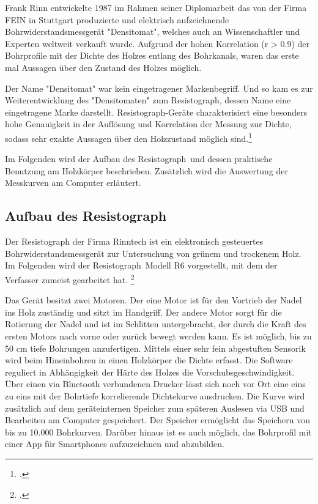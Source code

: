 \documentclass[a4paper, halfparskip]{article}
\def\SymbReg{\textsuperscript{\textregistered}}
\begin{document}
Frank Rinn entwickelte 1987 im Rahmen seiner Diplomarbeit das von der Firma
FEIN in Stuttgart produzierte und elektrisch aufzeichnende
Bohrwiderstandsmessgerät "Densitomat", welches auch an Wissenschaftler und
Experten weltweit verkauft wurde. Aufgrund der hohen Korrelation (r
\textgreater{} 0.9) der Bohrprofile mit der Dichte des Holzes entlang des
Bohrkanals, waren das erste mal Aussagen über den Zustand des Holzes möglich.

Der Name "Densitomat" war kein eingetragener Markenbegriff. Und so kam es zur
Weiterentwicklung des "Densitomaten" zum Resistograph\SymbReg, dessen Name
eine eingetragene Marke darstellt. Resistograph\SymbReg-Geräte charakterisiert
eine besonders hohe Genauigkeit in der Auflösung und Korrelation der Messung
zur Dichte, sodass sehr exakte Aussagen über den Holzzustand möglich
sind.\footcite{rinn:resi_drill_transition}

Im Folgenden wird der Aufbau des Resistograph\SymbReg\ und dessen praktische
Benutzung am Holzkörper beschrieben. Zusätzlich wird die Auswertung der
Messkurven am Computer erläutert. 

\subsection{Aufbau des Resistograph\SymbReg}
Der Resistograph der Firma Rinntech ist ein elektronisch gesteuertes
Bohrwiderstandsmessgerät zur Untersuchung von grünem und trockenem Holz. Im
Folgenden wird der Resistograph\SymbReg\ Modell R6 vorgestellt, mit dem der
Verfasser zumeist gearbeitet hat.
\footcite{rinn:risserkennung}

Das Gerät besitzt zwei Motoren. Der eine Motor ist für den Vortrieb der Nadel
ins Holz zuständig und sitzt im Handgriff. Der andere Motor sorgt für die
Rotierung der Nadel und ist im Schlitten untergebracht, der durch die Kraft
des ersten Motors nach vorne oder zurück bewegt werden kann. Es ist möglich,
bis zu 50 cm tiefe Bohrungen anzufertigen. Mittels einer sehr fein abgestuften
Sensorik wird beim Hineinbohren in einen Holzkörper die Dichte erfasst. Die
Software reguliert in Abhängigkeit der Härte des Holzes die
Vorschubsgeschwindigkeit. Über einen via Bluetooth verbundenen Drucker lässt
sich noch vor Ort eine eins zu eins mit der Bohrtiefe korrelierende
Dichtekurve ausdrucken. Die Kurve wird zusätzlich auf dem geräteinternen
Speicher zum späteren Auslesen via USB und Bearbeiten am Computer gespeichert.
Der Speicher ermöglicht das Speichern von bis zu 10.000 Bohrkurven. Darüber
hinaus ist es auch möglich, das Bohrprofil mit einer App für Smartphones
aufzuzeichnen und abzubilden.
\end{document}
